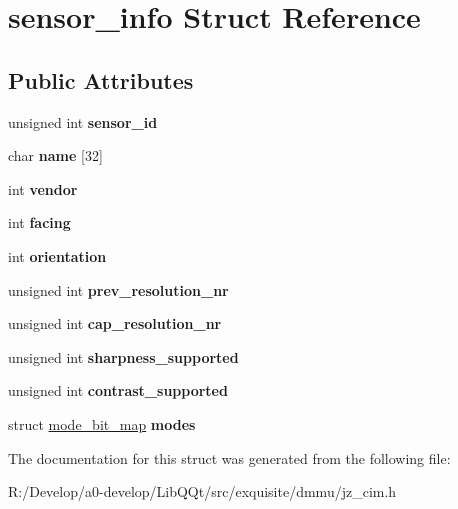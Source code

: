 \hypertarget{structsensor__info}{}\section{sensor\+\_\+info Struct Reference}
\label{structsensor__info}
\subsection*{Public Attributes}
\begin{DoxyCompactItemize}
\item 
\mbox{\label{structsensor__info_a2f102f87759d424db0e125b33759d4b9}} 
unsigned int {\bfseries sensor\+\_\+id}
\item 
\mbox{\label{structsensor__info_a9e20a921ce045a8be2533e867037fb31}} 
char {\bfseries name} \mbox{[}32\mbox{]}
\item 
\mbox{\label{structsensor__info_a3b286faa742dde8b931e4cb55027fbb4}} 
int {\bfseries vendor}
\item 
\mbox{\label{structsensor__info_a4531abf7451a50f9f17040e7dda5b8e8}} 
int {\bfseries facing}
\item 
\mbox{\label{structsensor__info_a69dad71ed8e894f9a27494623b07abb2}} 
int {\bfseries orientation}
\item 
\mbox{\label{structsensor__info_a386cdc9d53f34adb474a1aef4d78385b}} 
unsigned int {\bfseries prev\+\_\+resolution\+\_\+nr}
\item 
\mbox{\label{structsensor__info_a9e9625c7ab35cb93bb8fffaadf6516d2}} 
unsigned int {\bfseries cap\+\_\+resolution\+\_\+nr}
\item 
\mbox{\label{structsensor__info_ad08fadb1eeaae4e9ac850ce155707e66}} 
unsigned int {\bfseries sharpness\+\_\+supported}
\item 
\mbox{\label{structsensor__info_a461894272481de2addb8bd615729b9bb}} 
unsigned int {\bfseries contrast\+\_\+supported}
\item 
\mbox{\label{structsensor__info_a3c3013e9c60155f28c0db17062393f8c}} 
struct \mbox{\hyperlink{structmode__bit__map}{mode\+\_\+bit\+\_\+map}} {\bfseries modes}
\end{DoxyCompactItemize}


The documentation for this struct was generated from the following file\+:\begin{DoxyCompactItemize}
\item 
R\+:/\+Develop/a0-\/develop/\+Lib\+Q\+Qt/src/exquisite/dmmu/jz\+\_\+cim.\+h\end{DoxyCompactItemize}
